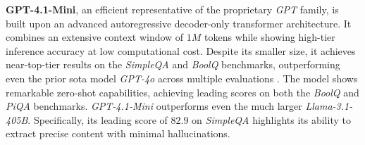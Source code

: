 \begin{table}[H]
    \centering
    \begin{threeparttable}
    \setlength{\tabcolsep}{5pt}
    \caption[Total Parameters $-$ Context Window]{
        Total Parameters and Context Windows of selected models.
    }\label{tab:total_par_llm_results}
    \end{threeparttable}
\end{table}
%
\textbf{GPT-4.1-Mini}, an efficient representative of the proprietary \textit{GPT} family, is built upon an advanced autoregressive decoder-only transformer architecture.
It combines an extensive context window of $1M$ tokens while showing high-tier inference accuracy at low computational cost.
Despite its smaller size, it achieves near-top-tier results on the \textit{SimpleQA} and \textit{BoolQ} benchmarks, outperforming even the prior \ac{sota} model \textit{GPT-4o} across multiple evaluations \citep{OpenAI2025GPT_4_1}.
The model shows remarkable zero-shot capabilities, achieving leading scores on both the \textit{BoolQ} and \textit{PiQA} benchmarks.
\textit{GPT-4.1-Mini} outperforms even the much larger \textit{Llama-3.1-405B}.
Specifically, its leading score of $82.9$ on \textit{SimpleQA} highlights its ability to extract precise content with minimal hallucinations.
